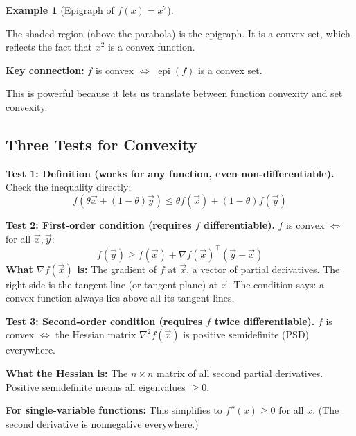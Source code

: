 \documentclass[10pt]{article}
\theoremstyle{definition}
\newtheorem{example}{Example}
\theoremstyle{plain}
\DeclareMathOperator{\epi}{epi}
\begin{document}
\begin{example}[Epigraph of $f(x) = x^2$]
\mbox{}

\begin{center}
\end{center}

The shaded region (above the parabola) is the epigraph. It is a convex set, which reflects the fact that $x^2$ is a convex function.
\end{example}

\begin{result}
\textbf{Key connection:} $f$ is convex $\iff$ $\epi(f)$ is a convex set.

This is powerful because it lets us translate between function convexity and set convexity.
\end{result}

\subsection{Three Tests for Convexity}

\begin{result}
\textbf{Test 1: Definition (works for any function, even non-differentiable).}
Check the inequality directly:
\[
    f(\theta \vec{x} + (1-\theta)\vec{y}) \le \theta f(\vec{x}) + (1-\theta)f(\vec{y})
\]
\end{result}

\begin{result}
\textbf{Test 2: First-order condition (requires $f$ differentiable).}
$f$ is convex $\iff$ for all $\vec{x}, \vec{y}$:
\[
    f(\vec{y}) \ge f(\vec{x}) + \nabla f(\vec{x})^\top (\vec{y} - \vec{x})
\]
\textbf{What $\nabla f(\vec{x})$ is:} The gradient of $f$ at $\vec{x}$, a vector of partial derivatives. The right side is the tangent line (or tangent plane) at $\vec{x}$. The condition says: a convex function always lies above all its tangent lines.
\end{result}

\begin{result}
\textbf{Test 3: Second-order condition (requires $f$ twice differentiable).}
$f$ is convex $\iff$ the Hessian matrix $\nabla^2 f(\vec{x})$ is positive semidefinite (PSD) everywhere.

\textbf{What the Hessian is:} The $n \times n$ matrix of all second partial derivatives. Positive semidefinite means all eigenvalues $\ge 0$.

\textbf{For single-variable functions:} This simplifies to $f''(x) \ge 0$ for all $x$. (The second derivative is nonnegative everywhere.)
\end{result}
\end{document}
